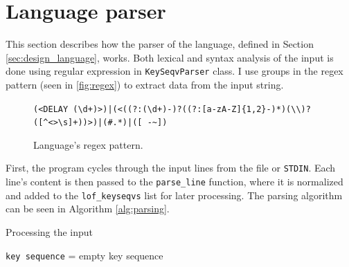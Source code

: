 \section{Language parser}
\label{sec:implementation_parser}
This section describes how the parser of the language, defined in Section \ref{sec:design_language}, works. Both lexical and syntax analysis of the input is done using regular expression in \verb|KeySeqvParser| class. I use groups in the regex pattern (seen in \autoref{fig:regex}) to extract data from the input string.
\begin{figure}[ht]
\centering
\begin{varwidth}{\linewidth}
\footnotesize
\verb=(<DELAY (\d+)>)|(<((?:(\d+)-)?((?:[a-zA-Z]{1,2}-)*)(\\)?([^<>\s]+))>)|(#.*)|([ -~])=
\end{varwidth}
\caption{Language's regex pattern.}
\label{fig:regex}
\end{figure}
First, the program cycles through the input lines from the file or \verb|STDIN|. Each line's content is then passed to the \verb|parse_line| function, where it is normalized and added to the \verb|lof_keyseqvs| list for later processing. The parsing algorithm can be seen in Algorithm \ref{alg:parsing}.
\begin{algorithm}
\caption{Processing the input}
\label{alg:parsing}
\texttt{key sequence} = empty key sequence\;
\end{algorithm}

